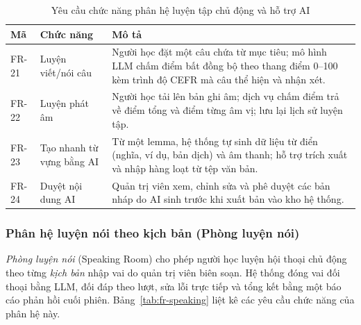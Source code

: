 \begin{table}[h]
  \centering
  \small
  \renewcommand{\arraystretch}{1.3}
  \begin{tabular}{|p{1.7cm}|p{3.4cm}|p{9.4cm}|}
    \hline
    \textbf{Mã} & \textbf{Chức năng} & \textbf{Mô tả} \\
    \hline
    FR-21 & Luyện viết/nói câu & Người học đặt một câu chứa từ mục tiêu; mô hình LLM chấm điểm bất đồng bộ theo thang điểm 0--100 kèm trình độ CEFR mà câu thể hiện và nhận xét. \\
    \hline
    FR-22 & Luyện phát âm & Người học tải lên bản ghi âm; dịch vụ chấm điểm trả về điểm tổng và điểm từng âm vị; lưu lại lịch sử luyện tập. \\
    \hline
    FR-23 & Tạo nhanh từ vựng bằng AI & Từ một lemma, hệ thống tự sinh dữ liệu từ điển (nghĩa, ví dụ, bản dịch) và âm thanh; hỗ trợ trích xuất và nhập hàng loạt từ tệp văn bản. \\
    \hline
    FR-24 & Duyệt nội dung AI & Quản trị viên xem, chỉnh sửa và phê duyệt các bản nháp do AI sinh trước khi xuất bản vào kho hệ thống. \\
    \hline
  \end{tabular}
  \caption{Yêu cầu chức năng phân hệ luyện tập chủ động và hỗ trợ AI}
  \label{tab:fr-ai}
\end{table}

\subsubsection{Phân hệ luyện nói theo kịch bản (Phòng luyện nói)}

\textit{Phòng luyện nói} (Speaking Room) cho phép người học luyện hội thoại
chủ động theo từng \textit{kịch bản} nhập vai do quản trị viên biên soạn. Hệ
thống đóng vai đối thoại bằng LLM, đối đáp theo lượt, sửa lỗi trực tiếp và
tổng kết bằng một báo cáo phản hồi cuối phiên. Bảng~\ref{tab:fr-speaking}
liệt kê các yêu cầu chức năng của phân hệ này.

